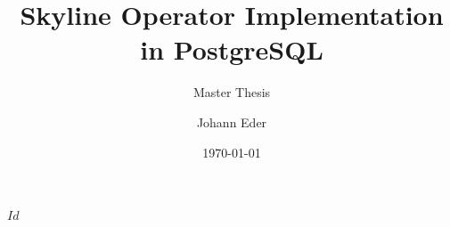 


\usepackage[latin1]{inputenc}

\usepackage{heder}

\usepackage[top=3cm, left=4cm, right=3cm]{geometry}

\usepackage{float}

\usepackage{graphicx}
	\graphicspath{{plots/}{diagrams/}}

\usepackage[round]{natbib}

\usepackage[nofancy]{svninfo}

\usepackage[small]{caption}

\usepackage{amsmath}
\usepackage{amssymb}

\usepackage{makeidx}

\usepackage{hyperref}



\makeindex



\svnInfo $Id$ 


\title{Skyline Operator Implementation in PostgreSQL}
\subtitle{Master Thesis}
\author{Johann Eder}
\date{\today}














\setcounter{tocdepth}{2} 
\tableofcontents



